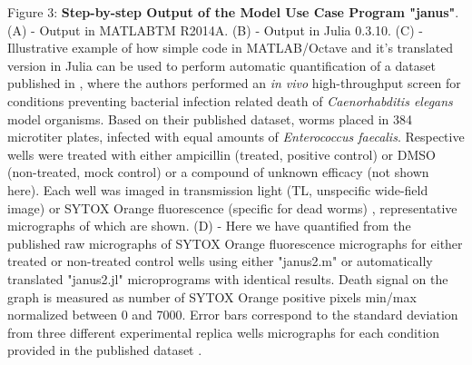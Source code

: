 Figure 3: \textbf{Step-by-step Output of the Model Use Case Program "janus"}. (A) - Output in MATLABTM R2014A. (B) - Output in Julia 0.3.10. (C) - Illustrative example of how simple code in MATLAB/Octave and it's translated version in Julia can be used to perform automatic quantification of a dataset published in \cite{Moy_2009}, where the authors performed an \textit{in vivo} high-throughput screen for conditions preventing bacterial infection related death of \textit{Caenorhabditis elegans} model organisms. Based on their published dataset, worms placed in 384 microtiter plates, infected with equal amounts of \textit{Enterococcus faecalis}. Respective wells were treated with either ampicillin (treated, positive control) or DMSO (non-treated, mock control) or a compound of unknown efficacy (not shown here). Each well was imaged in transmission light (TL, unspecific wide-field image) or SYTOX Orange fluorescence (specific for dead worms) \cite{Moy_2009}, representative micrographs of which are shown. (D) - Here we have quantified from the published raw micrographs of SYTOX Orange fluorescence micrographs for either treated or non-treated control wells using either "janus2.m" or automatically translated "janus2.jl" microprograms with identical results. Death signal on the graph is measured as number of SYTOX Orange positive pixels min/max normalized between 0 and 7000. Error bars correspond to the standard deviation from three different experimental replica wells micrographs for each condition provided in the published dataset \cite{Moy_2009}.